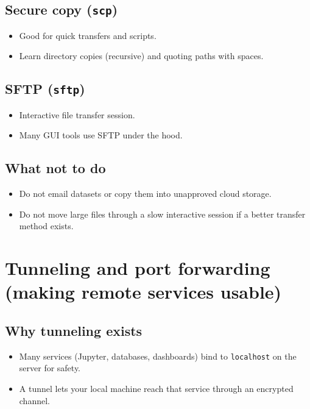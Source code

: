 \subsection{Secure copy (\texttt{scp})}
\begin{itemize}
\item Good for quick transfers and scripts.
\item Learn directory copies (recursive) and quoting paths with spaces.
\end{itemize}

\subsection{SFTP (\texttt{sftp})}
\begin{itemize}
\item Interactive file transfer session.
\item Many GUI tools use SFTP under the hood.
\end{itemize}

\subsection{What not to do}
\begin{itemize}
\item Do not email datasets or copy them into unapproved cloud storage.
\item Do not move large files through a slow interactive session if a better transfer method exists.
\end{itemize}

\section{Tunneling and port forwarding (making remote services usable)}
\subsection{Why tunneling exists}
\begin{itemize}
\item Many services (Jupyter, databases, dashboards) bind to \texttt{localhost} on the server for safety.
\item A tunnel lets your local machine reach that service through an encrypted channel.
\end{itemize}

